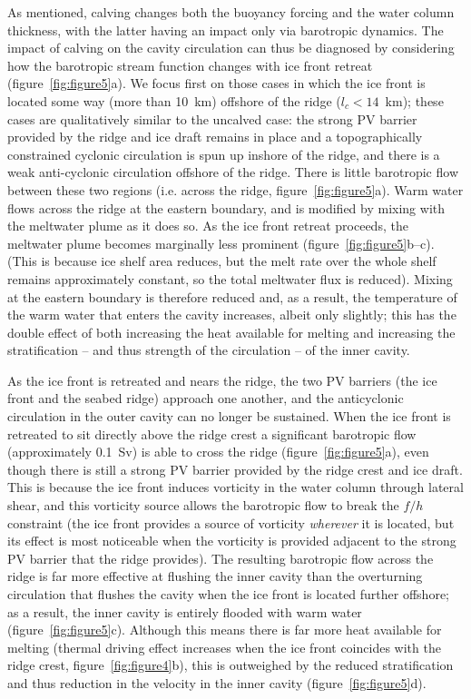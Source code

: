 \documentclass[draft]{agujournal2019}
\begin{document}
As mentioned, calving changes both the buoyancy forcing and the water column thickness, with the latter having an impact only via barotropic dynamics. The impact of calving on the cavity circulation can thus be diagnosed by considering how the barotropic stream function changes with ice front retreat (figure~\ref{fig:figure5}a). We focus first on those cases in which the ice front is located some way (more than 10~km) offshore of the ridge ($l_c<14$~km); these cases are qualitatively similar to the uncalved case: the strong PV barrier provided by the ridge and ice draft remains in place and a topographically constrained cyclonic circulation is spun up inshore of the ridge, and there is a weak anti-cyclonic circulation offshore of the ridge. There is little barotropic flow between these two regions (i.e. across the ridge, figure~\ref{fig:figure5}a). Warm water flows across the ridge at the eastern boundary, and is modified by mixing with the meltwater plume as it does so. As the ice front retreat proceeds, the meltwater plume becomes marginally less prominent (figure~\ref{fig:figure5}b--c). (This is because ice shelf area reduces, but the melt rate over the whole shelf remains approximately constant, so the total meltwater flux is reduced). Mixing at the eastern boundary is therefore reduced and, as a result, the temperature of the warm water that enters the cavity increases, albeit only slightly; this has the double effect of both increasing the heat available for melting and increasing the stratification -- and thus strength of the circulation -- of the inner cavity.

As the ice front is retreated and nears the ridge, the two PV barriers (the ice front and the seabed ridge) approach one another, and the anticyclonic circulation in the outer cavity can no longer be sustained.  When the ice front is retreated to sit directly above the ridge crest a significant barotropic flow (approximately 0.1~Sv) is able to cross the ridge (figure~\ref{fig:figure5}a), even though there is still a strong PV barrier provided by the ridge crest and ice draft. This is because the ice front induces vorticity in the water column through lateral shear, and this vorticity source allows the barotropic flow to break the $f/h$ constraint (the ice front provides a source of vorticity \emph{wherever} it is located, but its effect is most noticeable when the vorticity is provided adjacent to the strong PV barrier that the ridge provides).  The resulting barotropic flow across the ridge is far more effective at flushing the inner cavity than the overturning circulation that flushes the cavity when the ice front is located further offshore; as a result, the inner cavity is entirely flooded with warm water (figure~\ref{fig:figure5}c). Although this means there is far more heat available for melting (thermal driving effect increases when the ice front coincides with the ridge crest, figure~\ref{fig:figure4}b), this is outweighed by the reduced stratification and thus reduction in the velocity in the inner cavity (figure~\ref{fig:figure5}d).
\end{document}
